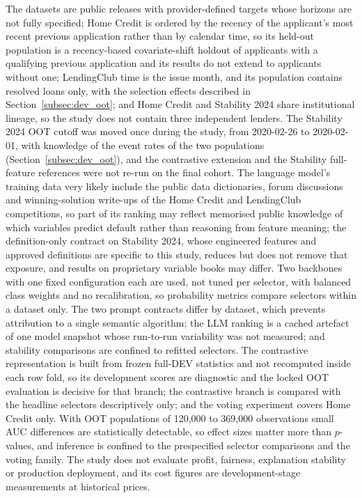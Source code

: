 \documentclass[final,5p,twocolumn]{elsarticle}
\begin{document}
The datasets are public releases with provider-defined targets whose horizons are not fully specified; Home Credit is ordered by the recency of the applicant's most recent previous application rather than by calendar time, so its held-out population is a recency-based covariate-shift holdout of applicants with a qualifying previous application and its results do not extend to applicants without one; LendingClub time is the issue month, and its population contains resolved loans only, with the selection effects described in Section~\ref{subsec:dev_oot}; and Home Credit and Stability 2024 share institutional lineage, so the study does not contain three independent lenders. The Stability 2024 OOT cutoff was moved once during the study, from 2020-02-26 to 2020-02-01, with knowledge of the event rates of the two populations (Section~\ref{subsec:dev_oot}), and the contrastive extension and the Stability full-feature references were not re-run on the final cohort. The language model's training data very likely include the public data dictionaries, forum discussions and winning-solution write-ups of the Home Credit and LendingClub competitions, so part of its ranking may reflect memorised public knowledge of which variables predict default rather than reasoning from feature meaning; the definition-only contract on Stability 2024, whose engineered features and approved definitions are specific to this study, reduces but does not remove that exposure, and results on proprietary variable books may differ. Two backbones with one fixed configuration each are used, not tuned per selector, with balanced class weights and no recalibration, so probability metrics compare selectors within a dataset only. The two prompt contracts differ by dataset, which prevents attribution to a single semantic algorithm; the LLM ranking is a cached artefact of one model snapshot whose run-to-run variability was not measured; and stability comparisons are confined to refitted selectors. The contrastive representation is built from frozen full-DEV statistics and not recomputed inside each row fold, so its development scores are diagnostic and the locked OOT evaluation is decisive for that branch; the contrastive branch is compared with the headline selectors descriptively only; and the voting experiment covers Home Credit only. With OOT populations of 120,000 to 369,000 observations small AUC differences are statistically detectable, so effect sizes matter more than $p$-values, and inference is confined to the prespecified selector comparisons and the voting family. The study does not evaluate profit, fairness, explanation stability or production deployment, and its cost figures are development-stage measurements at historical prices.
\end{document}

